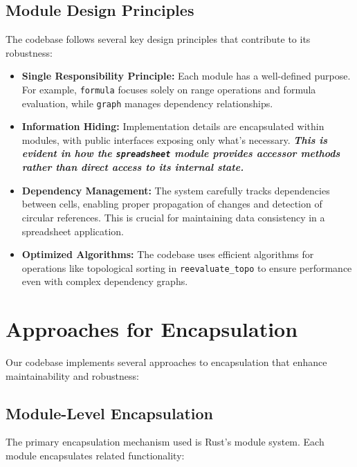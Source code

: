 \documentclass[11pt,a4paper]{article}
\begin{document}
\subsection{Module Design Principles}

The codebase follows several key design principles that contribute to its robustness:

\begin{itemize}
  \item \textbf{Single Responsibility Principle:} Each module has a well-defined purpose. For example, \lstinline{formula} focuses solely on range operations and formula evaluation, while \lstinline{graph} manages dependency relationships.
  
  \item \textbf{Information Hiding:} Implementation details are encapsulated within modules, with public interfaces exposing only what's necessary. \textbf{\textit{This is evident in how the \lstinline{spreadsheet} module provides accessor methods rather than direct access to its internal state.}}
  
  \item \textbf{Dependency Management:} The system carefully tracks dependencies between cells, enabling proper propagation of changes and detection of circular references. This is crucial for maintaining data consistency in a spreadsheet application.
  
  \item \textbf{Optimized Algorithms:} The codebase uses efficient algorithms for operations like topological sorting in \lstinline{reevaluate_topo} to ensure performance even with complex dependency graphs.
\end{itemize}

\section{Approaches for Encapsulation}
\label{sec:encapsulation}

Our codebase implements several approaches to encapsulation that enhance maintainability and robustness:

\subsection{Module-Level Encapsulation}

The primary encapsulation mechanism used is Rust's module system. Each module encapsulates related functionality:
\end{document}
